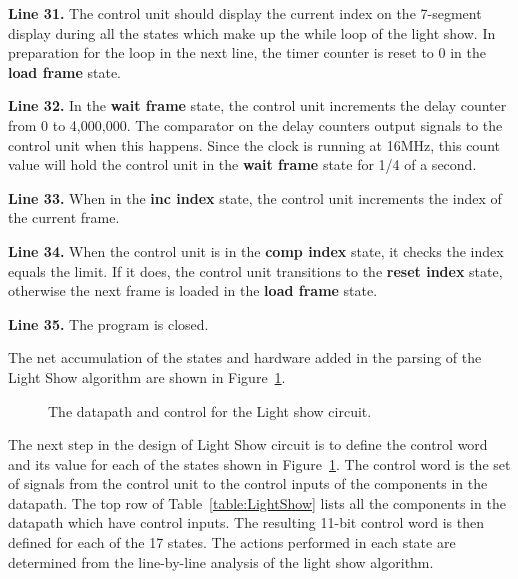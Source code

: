 \textbf{ Line 31.} The control unit should display the current index on the 7-segment display
during all the states which make up the while loop of the light show.  In preparation for
the loop in the next line, the timer counter is reset to 0 in the \textbf{ load frame}
state.

\textbf{ Line 32.} In the \textbf{ wait frame} state, the control unit increments the
delay counter from 0 to 4,000,000.  The comparator on the delay counters output
signals to the control unit when this happens.  Since the clock is running at
16MHz, this count value will hold the control unit in the \textbf{ wait frame} state
for 1/4 of a second.

\textbf{ Line 33.}  When in the \textbf{ inc index} state, the control unit increments
the index of the current frame.

\textbf{ Line 34.} When the control unit is in the \textbf{ comp index} state, it checks
the index equals the limit.  If it does, the control unit transitions to
the \textbf{ reset index} state, otherwise the next frame is loaded in the
\textbf{ load frame} state.

\textbf{ Line 35.}  The program is closed.

The net accumulation of the states and hardware added in the parsing of the Light Show
algorithm are shown in Figure~\ref{fig:datapathControlLightShowCir}.

\begin{figure}[ht]
    \caption{The datapath and control for the Light show circuit.}
    \label{fig:datapathControlLightShowCir}
\end{figure}

The next step in the design of Light Show circuit is to define the control word and
its value for each of the states shown in Figure~\ref{fig:datapathControlLightShowCir}.  The control
word is the set of signals from the control unit to the control inputs of the
components in the datapath.  The top row of Table~\ref{table:LightShow} lists all
the components in the datapath which have control inputs.  The resulting 11-bit control
word is then defined for each of the 17 states. The actions performed in each state
are determined from the line-by-line analysis of the light show algorithm.

